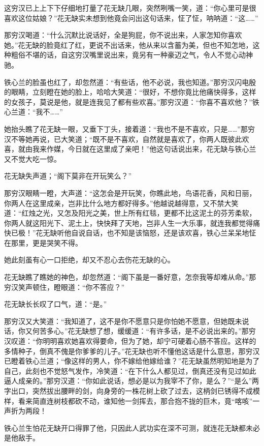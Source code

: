 \documentclass[12pt,oneside]{book}
\begin{document}
这穷汉已上上下下仔细地打量了花无缺几眼，突然咧嘴一笑，道：``你心里可是很喜欢这位姑娘？''花无缺实未想到他竟会问出这句话来，怔了怔，呐呐道：``这\ldots\ldots{}''

那穷汉喝道：``什么沉默比说话好，全是狗屁，你不说出来，人家怎知你喜欢她。''花无缺的脸竟红了红，更说不出话来，他从来以含蓄为美，但也不知怎地，这种粗俗不堪的话，自这穷汉嘴里说出来，竟另有一种豪迈之气，令人不觉心动神驰。

铁心兰的脸虽也红了，却忽然道：``有些话，他不必说，我也知道。''那穷汉闪电殷的眼睛，立刻瞪在她的脸上，哈哈大笑道：``很好，不想你竟比他痛快得多，这样的女孩子，莫说是他，就是连我见了都有些欢喜。''那穷汉道：``你喜不喜欢他？''铁心兰道：``我不\ldots\ldots{}''

她抬头瞧了花无缺一眼，又垂下丁头，接着道：``我也不是不喜欢，只是\ldots\ldots{}''那穷汉不等她再说，已大笑道；``既不是不喜欢，自然就是喜欢了，你两人既彼此欢喜，就由我来作媒，今日就在这里成了亲吧！''他这句话说出来，花无缺与铁心兰又不觉大吃一惊。

花无缺失声道；``阁下莫非在开玩笑么？''

那穷汉眼睛一瞪，大声道：``这怎会是开玩笑，你瞧此地，鸟语花香，风和日丽，你两人在这里成亲，岂非比什么地方都好得多。''他越说越得意，又不禁大笑道：``红烛之光，又怎及阳光之美，世上所有红毯，更都不比这泥土的芬芳柔软，你两人就这阳光下、泥土上，快快拜了天地，岂非人生一大乐事，就连我都觉得痛快已极！''花无缺听他自说自话，也不知是该恼怒，还是该欢喜，铁心兰呆呆地怔在那里，更是哭笑不得。

她此刻虽有心一口拒绝，却又不忍心去伤花无缺的心。

花无缺瞧了瞧她的神色，却忽然道：``阁下虽是一番好意，怎奈我等却难从命。''那穷汉笑声顿住，瞪眼道：``你不答应？''

花无缺长长叹了口气，道：``是。''

那穷汉又大笑道：``我知道了，这不是你不愿意只是你怕她不愿意，但她既未说话，你又何苦多心。''花无缺想了想，缓缓道：``有许多话，是不必说出来的。''那穷汉叹道：``你明明喜欢她喜欢得要命，但为了她，却宁可硬着心肠不答应。这样的多情种子，倒真不傀是你爹爹的儿子。''花无缺也听不懂他这话是什么意思，那穷汉已瞪着铁心兰道；``像这样的男人，你不嫁给他嫁给谁？''花无缺虽然明知地是为了自己，此刻也不觉怒气发作，冷笑道：``在下什么人都见过，倒真还没有见过如此逼人成亲的。''那穷汉道：``你如此说话，想必是以为我宰不了你，是么？''``是么''两字出口，突然拔出腰畔的剑，向身旁的一株花树上砍了过去，这柄剑已锈得不成模样，看来简直连树枝都砍不动，谁知他一剑挥去，那合抱不拢的巨木，竟``喀咳''一声折为两段！

铁心兰生怕花无缺开口得罪了他，只因此人武功实在深不可测，就连花无缺都未必是他敌手。
\end{document}
